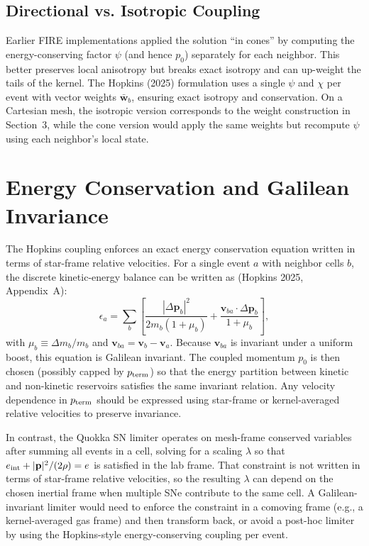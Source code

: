 \documentclass[11pt]{article}
\begin{document}
\subsection{Directional vs. Isotropic Coupling}
Earlier FIRE implementations applied the solution ``in cones'' by computing
the energy-conserving factor $\psi$ (and hence $p_{0}$) separately for each
neighbor. This better preserves local anisotropy but breaks exact isotropy and
can up-weight the tails of the kernel. The Hopkins (2025) formulation uses a
single $\psi$ and $\chi$ per event with vector weights $\bar{\mathbf w}_{b}$,
ensuring exact isotropy and conservation. On a Cartesian mesh, the isotropic
version corresponds to the weight construction in Section~3, while the cone
version would apply the same weights but recompute $\psi$ using each
neighbor's local state.

\section{Energy Conservation and Galilean Invariance}
The Hopkins coupling enforces an exact energy conservation equation written in
terms of star-frame relative velocities. For a single event $a$ with neighbor
cells $b$, the discrete kinetic-energy balance can be written as (Hopkins 2025,
Appendix~A):
\begin{equation}
\epsilon_{a} = \sum_{b}\left[\frac{|\Delta \mathbf p_{b}|^{2}}{2 m_{b}(1+\mu_{b})}
+ \frac{\mathbf v_{ba}\cdot\Delta \mathbf p_{b}}{1+\mu_{b}}\right],
\end{equation}
with $\mu_{b}\equiv \Delta m_{b}/m_{b}$ and $\mathbf v_{ba}=\mathbf v_{b}-\mathbf v_{a}$.
Because $\mathbf v_{ba}$ is invariant under a uniform boost, this equation is
Galilean invariant. The coupled momentum $p_{0}$ is then chosen (possibly capped
by $p_{\rm term}$) so that the energy partition between kinetic and non-kinetic
reservoirs satisfies the same invariant relation. Any velocity dependence in
$p_{\rm term}$ should be expressed using star-frame or kernel-averaged relative
velocities to preserve invariance.

In contrast, the Quokka SN limiter operates on mesh-frame conserved variables
after summing all events in a cell, solving for a scaling $\lambda$ so that
$e_{\rm int}+|\mathbf p|^{2}/(2\rho)=e$ is satisfied in the lab frame. That
constraint is not written in terms of star-frame relative velocities, so the
resulting $\lambda$ can depend on the chosen inertial frame when multiple SNe
contribute to the same cell. A Galilean-invariant limiter would need
to enforce the constraint in a comoving frame (e.g., a kernel-averaged gas
frame) and then transform back, or avoid a post-hoc limiter by using the
Hopkins-style energy-conserving coupling per event.
\end{document}
